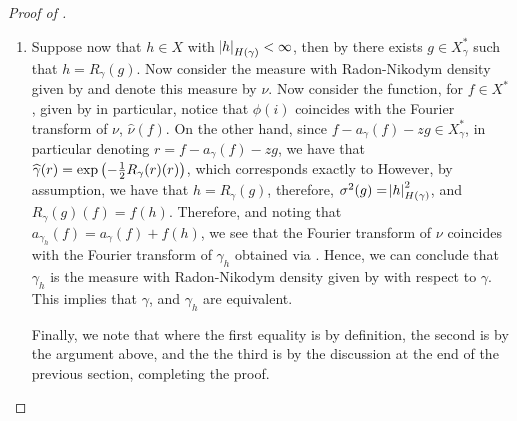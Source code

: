 \documentclass[../main.tex]{subfiles}
\begin{document}
\begin{proof}[Proof of ]
\begin{enumerate}
    \item Suppose now that $h\in X$ with $\abs{h}_{H(\gamma)}<\infty$, then by  there exists $g\in X_\gamma^*$ such that $h = R_\gamma(g)$. Now consider the measure with Radon-Nikodym density given by  and denote this measure by $\nu$. Now consider the function, for $f\in X^*$, given by  in particular, notice that $\phi(i)$ coincides with the Fourier transform of $\nu$, $\hat\nu(f)$. On the other hand, since $f-a_\gamma(f) - zg\in X_\gamma^*$, in particular denoting $r = f-a_\gamma(f)-zg$, we have that $\hat\gamma(r) = \exp\del{-\frac12R_\gamma(r)(r)}$, which corresponds exactly to  However, by assumption, we have that $h = R_\gamma(g)$, therefore, $\sigma^2(g) = \abs{h}_{H(\gamma)}^2$, and $R_\gamma(g)(f) = f(h)$. Therefore,  and noting that $a_{\gamma_h}(f) = a_\gamma(f) + f(h)$, we see that the Fourier transform of $\nu$ coincides with the Fourier transform of $\gamma_h$ obtained via . Hence, we can conclude that $\gamma_h$ is the measure with Radon-Nikodym density given by  with respect to $\gamma$. This implies that $\gamma$, and $\gamma_h$ are equivalent.

    Finally, we note that  where the first equality is by definition, the second is by the argument above, and the the third is by the discussion at the end of the previous section, completing the proof.
\end{enumerate}

\end{proof}
\end{document}
